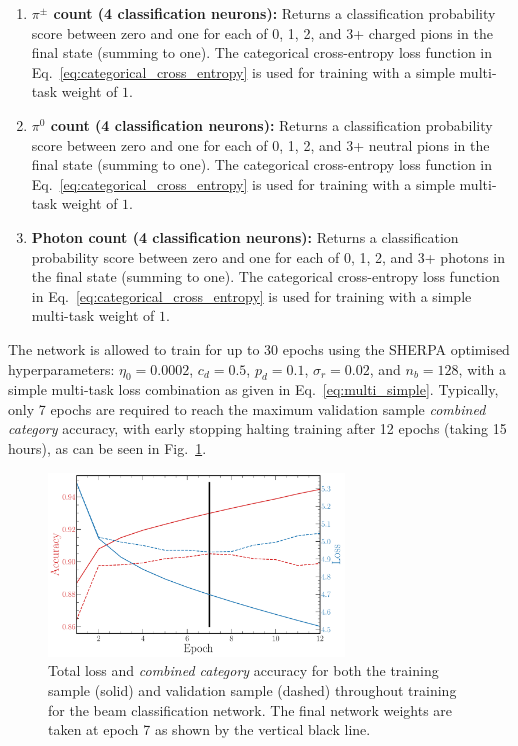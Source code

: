 \begin{enumerate}
          (summing to one). The categorical cross-entropy loss function in
          Eq.~\ref{eq:categorical_cross_entropy} is used for training with a simple multi-task
          weight of $1$.
    \item \textbf{$\pi^{\pm}$ count (4 classification neurons):} Returns a classification
          probability score between zero and one for each of 0, 1, 2, and 3+ charged pions in the
          final state (summing to one). The categorical cross-entropy loss function in
          Eq.~\ref{eq:categorical_cross_entropy} is used for training with a simple multi-task
          weight of $1$.
    \item \textbf{$\pi^{0}$ count (4 classification neurons):} Returns a classification
          probability score between zero and one for each of 0, 1, 2, and 3+ neutral pions in the
          final state (summing to one). The categorical cross-entropy loss function in
          Eq.~\ref{eq:categorical_cross_entropy} is used for training with a simple multi-task
          weight of $1$.
    \item \textbf{Photon count (4 classification neurons):} Returns a classification probability
          score between zero and one for each of 0, 1, 2, and 3+ photons in the final state
          (summing to one). The categorical cross-entropy loss function in
          Eq.~\ref{eq:categorical_cross_entropy} is used for training with a simple multi-task
          weight of $1$.
\end{enumerate}

The network is allowed to train for up to 30 epochs using the SHERPA optimised hyperparameters:
$\eta_{0}=0.0002$, $c_{d}=0.5$, $p_{d}=0.1$, $\sigma_{r}=0.02$, and $n_{b}=128$, with a simple
multi-task loss combination as given in Eq.~\ref{eq:multi_simple}. Typically, only 7 epochs are
required to reach the maximum validation sample \emph{combined category} accuracy, with early
stopping halting training after 12 epochs (taking 15 hours), as can be seen in
Fig.~\ref{fig:final_beam_history}.

\begin{figure} %
    \includegraphics[width=0.7\textwidth]{diagrams/7-results/final_beam_history.pdf}
    \caption[Loss and accuracy throughout training for the beam classification network]
    {Total loss and \emph{combined category} accuracy for both the training sample (solid) and
        validation sample (dashed) throughout training for the beam classification network. The
        final network weights are taken at epoch 7 as shown by the vertical black line.}
    \label{fig:final_beam_history}
\end{figure}


